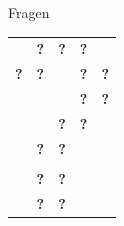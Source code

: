 \documentclass{beamer}
\begin{document}
\begin{frame}{Fragen}
  \begin{center}
    \begin{LARGE}
      \begin{tabular}{ccccc}
         & \textbf{?} & \textbf{?} & \textbf{?} & \\
        \textbf{?} & \textbf{?} &  & \textbf{?} & \textbf{?}\\
         &  &  & \textbf{?} & \textbf{?}\\
         &  & \textbf{?} & \textbf{?} & \\
         & \textbf{?} & \textbf{?} &  & \\
         &  &  &  & \\
         & \textbf{?} & \textbf{?} &  & \\
         & \textbf{?} & \textbf{?} &  & 
      \end{tabular}
    \end{LARGE}
  \end{center}
\end{frame}
\end{document}
